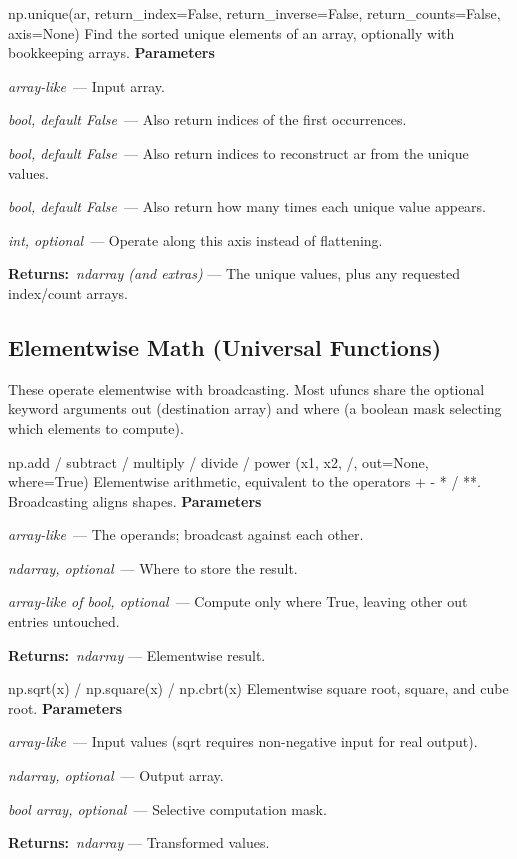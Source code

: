 \documentclass[10pt]{article}
\newenvironment{params}
  {\smallskip\textbf{\small\color{accent}Parameters}\par\nopagebreak
   \begin{description}[leftmargin=1.3em,itemsep=1.5pt,parsep=0pt,topsep=1pt,
      labelindent=0pt,style=sameline,font=\normalfont]}
  {\end{description}}
\newcommand{\pitem}[3]{\item[{\ttfamily\color{accent}#1}]{\itshape #2}\ --- #3}
\newcommand{\preturn}[2]{\smallskip\textbf{\small\color{accent}Returns:}\ {\itshape #1} --- #2\par}
\begin{document}
\begin{func}{np.unique(ar, return\_index=False, return\_inverse=False, return\_counts=False, axis=None)}
Find the sorted unique elements of an array, optionally with bookkeeping arrays.
\begin{params}
\pitem{ar}{array-like}{Input array.}
\pitem{return\_index}{bool, default False}{Also return indices of the first occurrences.}
\pitem{return\_inverse}{bool, default False}{Also return indices to reconstruct ar from the unique values.}
\pitem{return\_counts}{bool, default False}{Also return how many times each unique value appears.}
\pitem{axis}{int, optional}{Operate along this axis instead of flattening.}
\end{params}
\preturn{ndarray (and extras)}{The unique values, plus any requested index/count arrays.}
\end{func}
\medskip

\subsection{Elementwise Math (Universal Functions)}
These operate elementwise with broadcasting. Most ufuncs share the optional keyword arguments out (destination array) and where (a boolean mask selecting which elements to compute).

\begin{func}{np.add / subtract / multiply / divide / power (x1, x2, /, out=None, where=True)}
Elementwise arithmetic, equivalent to the operators + - * / **. Broadcasting aligns shapes.
\begin{params}
\pitem{x1, x2}{array-like}{The operands; broadcast against each other.}
\pitem{out}{ndarray, optional}{Where to store the result.}
\pitem{where}{array-like of bool, optional}{Compute only where True, leaving other out entries untouched.}
\end{params}
\preturn{ndarray}{Elementwise result.}
\end{func}
\medskip

\begin{func}{np.sqrt(x) / np.square(x) / np.cbrt(x)}
Elementwise square root, square, and cube root.
\begin{params}
\pitem{x}{array-like}{Input values (sqrt requires non-negative input for real output).}
\pitem{out}{ndarray, optional}{Output array.}
\pitem{where}{bool array, optional}{Selective computation mask.}
\end{params}
\preturn{ndarray}{Transformed values.}
\end{func}
\medskip
\end{document}

